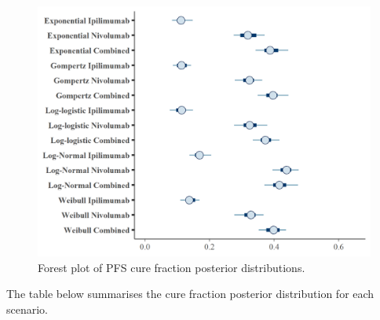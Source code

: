 \documentclass[
]{article}
\begin{document}
\begin{figure}

{\centering \includegraphics[width=0.6\linewidth]{../plots/cf_pfs_forest_plot} 

}

\caption{\label{fig:forest_pfs}Forest plot of PFS cure fraction posterior distributions.}\label{fig:unnamed-chunk-13}
\end{figure}

The table below summarises the cure fraction posterior distribution for
each scenario.
\end{document}
